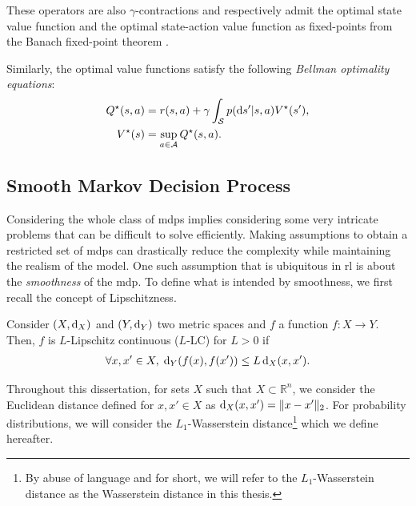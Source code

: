 These operators are also $\gamma$-contractions \cite[Proposition~6.2.4]{puterman1994markov} and respectively admit the optimal state value function and the optimal state-action value function as fixed-points from the Banach fixed-point theorem \cite[Proposition~6.2.5]{puterman1994markov}. 

Similarly, the optimal value functions satisfy the following \emph{Bellman optimality equations}:
\begin{align}
    Q^\star(s,a) &= r(s,a) + \gamma  \int_{\mathcal{S}}  p(\mathrm{d} s'\vert s,a)V^\star(s'),
    \label{eq:bellman_optimal_equation_Q}\\
    V^\star(s) &= \sup_{a\in\mathcal{A}} Q^\star(s,a).
    \label{eq:bellman_optimal_equation_V}
\end{align}


\subsection{Smooth Markov Decision Process}
\label{subsec:smooth_mdp}

Considering the whole class of \glspl{mdp} implies considering some very intricate problems that can be difficult to solve efficiently.
Making assumptions to obtain a restricted set of \glspl{mdp} can drastically reduce the complexity while maintaining the realism of the model. 
One such assumption that is ubiquitous in \gls{rl} is about the \emph{smoothness} of the \gls{mdp}.
To define what is intended by smoothness, we first recall the concept of Lipschitzness.  

\begin{defi}
    Consider $(X,\operatorname{\text{\normalfont d}}_X)$ and $(Y,\operatorname{\text{\normalfont d}}_Y)$ two metric spaces and $f$ a function $f:X \rightarrow Y$. Then, $f$ is $L$-Lipschitz continuous ($L$-LC) for $L>0$ if 
    \begin{align*}
        \forall x,x'\in X,\; \operatorname{\text{\normalfont d}}_Y(f(x),f(x'))\leq L \operatorname{\text{\normalfont d}}_X(x,x').
    \end{align*}
\end{defi}

Throughout this dissertation, for sets $X$ such that $X\subset \mathbb{R}^n$, we consider the Euclidean distance defined for $x,x'\in X$ as $\operatorname{\text{\normalfont d}}_{X}(x,x')=\lVert x-x'\rVert_2$.
For probability distributions, we will consider the $L_1$-Wasserstein distance\footnote{By abuse of language and for short, we will refer to the $L_1$-Wasserstein distance as the Wasserstein distance in this thesis.} which we define hereafter.

